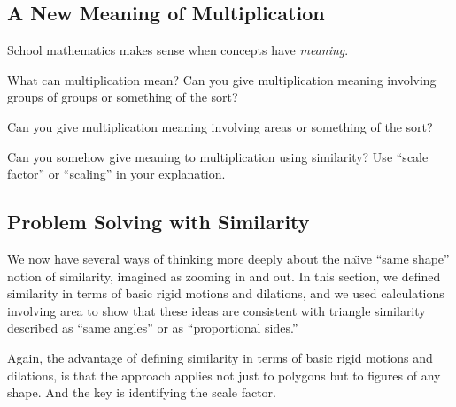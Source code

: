 \subsection{A New Meaning of Multiplication}
School mathematics makes sense when concepts have \emph{meaning}.  

\begin{question} 
What can multiplication mean?  Can you give multiplication meaning involving groups of groups or
something of the sort?
\end{question}
\QM

\begin{question} 
Can you give multiplication meaning involving areas or something of the sort?
\end{question}
\QM

\begin{question} 
Can you somehow give meaning to multiplication using similarity?  Use ``scale factor'' or ``scaling'' in your explanation.
\end{question}
\QM

\newpage 

\subsection{Problem Solving with Similarity} 


We now have several ways of thinking more deeply about the na\"{\i}ve ``same shape'' notion of similarity, imagined as zooming in and out.  In this section, we defined similarity in terms of basic rigid motions and dilations, and we used calculations involving area to show that these ideas are consistent with triangle similarity described as ``same angles''  or as ``proportional sides.''

Again, the advantage of defining similarity in terms of basic rigid motions and dilations, is that the approach 
applies not just to polygons but to figures of any shape.  And the key is identifying the scale factor.  


